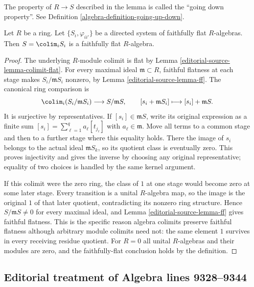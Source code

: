 \noindent
The property of $R \to S$ described in the lemma is called the
``going down property''. See Definition \ref{algebra-definition-going-up-down}.

\begin{lemma}
\label{editorial-source-lemma-colimit-faithfully-flat}
Let $R$ be a ring. Let $\{S_i, \varphi_{ii'}\}$ be a directed system of
faithfully flat $R$-algebras. Then $S = \colim_i S_i$ is a faithfully flat
$R$-algebra.
\end{lemma}

\begin{proof}
The underlying $R$-module colimit is flat by
Lemma \ref{editorial-source-lemma-colimit-flat}. For every maximal ideal
$\mathfrak m\subset R$, faithful flatness at each stage
makes $S_i/\mathfrak mS_i$ nonzero, by Lemma \ref{editorial-source-lemma-ff}.
The canonical ring comparison is
$$
\colim_i(S_i/\mathfrak mS_i)\longrightarrow S/\mathfrak mS,
\qquad [s_i+\mathfrak mS_i]\longmapsto[s_i]+\mathfrak mS.
$$
It is surjective by representatives. If $[s_i]\in\mathfrak mS$,
write its original expression as a finite sum
$[s_i]=\sum_{\ell=1}^q a_\ell[t_{j_\ell}]$ with
$a_\ell\in\mathfrak m$. Move all terms to a common stage
and then to a further stage where this equality holds.
There the image of $s_i$ belongs to the actual ideal
$\mathfrak mS_k$, so its quotient class is eventually zero.
This proves injectivity and gives the inverse by choosing
any original representative; equality of two choices is
handled by the same kernel argument.

If this colimit were the zero ring, the class of $1$ at
one stage would become zero at some later stage. Every
transition is a unital $R$-algebra map, so the image is
the original $1$ of that later quotient, contradicting
its nonzero ring structure. Hence $S/\mathfrak mS\ne0$
for every maximal ideal, and Lemma \ref{editorial-source-lemma-ff} gives
faithful flatness. This is the specific reason algebra
colimits preserve faithful flatness although arbitrary
module colimits need not: the same element $1$ survives
in every receiving residue quotient. For $R=0$ all
unital $R$-algebras and their modules are zero, and the
faithfully-flat conclusion holds by the definition.
\end{proof}








\subsection{Editorial treatment of Algebra lines 9328--9344}

